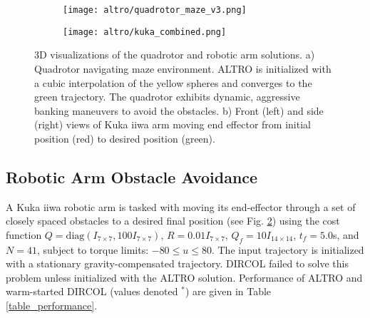 \documentclass[../root.tex]{subfiles}
\begin{document}
    \begin{figure}
        \begin{subfigure}[b]{0.48\textwidth}
            \texttt{[image: altro/quadrotor\_maze\_v3.png]}
            \caption{}
            \label{quad_infeasible}
        \end{subfigure} 
        \hfill
        \begin{subfigure}[b]{0.48\textwidth}
            \texttt{[image: altro/kuka\_combined.png]}
            \caption{}
        \end{subfigure}
        \caption{3D visualizations of the quadrotor and robotic arm solutions. 
            a) Quadrotor navigating maze environment. ALTRO is
            initialized with a cubic interpolation of the yellow spheres and
            converges to the green trajectory. The quadrotor exhibits dynamic,
            aggressive banking maneuvers to avoid the obstacles.
            b) Front (left) and side (right) views of Kuka iiwa arm moving
            end effector from initial position (red) to desired position (green).
            \label{fig:kuka_snapshot}
            }
    \end{figure}
   
\subsection{Robotic Arm Obstacle Avoidance}
    A Kuka iiwa robotic arm is tasked with moving its end-effector through a
    set of closely spaced obstacles to a desired final position (see Fig.
    \ref{fig:kuka_snapshot}) using the cost function $Q = \text{diag}(I_{7
    \times 7},100I_{7 \times 7})$, $R = 0.01I_{7 \times 7}$, $Q_f = 10I_{14
    \times 14}$, $t_f = 5.0$s, and $N = 41$, subject to torque limits: $-80
    \leq u \leq 80$. The input trajectory is initialized with a stationary
    gravity-compensated trajectory. DIRCOL failed to solve this problem unless
    initialized with the ALTRO solution. Performance of ALTRO and warm-started
    DIRCOL (values denoted $^*$) are given in Table \ref{table_performance}.
   
   \begin{figure}[t]
       \centering
   \end{figure}
\end{document}
